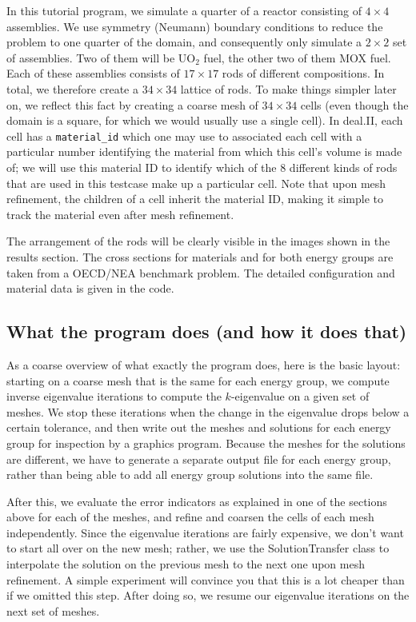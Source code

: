 \documentclass{article}
\begin{document}
In this tutorial program, we simulate a quarter of a reactor consisting of $4
\times 4$ assemblies. We use symmetry (Neumann) boundary conditions to reduce
the problem to one quarter of the domain, and consequently only simulate a
$2\times 2$ set of assemblies. Two of them will be UO${}_2$ fuel, the other
two of them MOX fuel. Each of these assemblies consists of $17\times 17$ rods
of different compositions. In total, we therefore create a $34\times 34$
lattice of rods. To make things simpler later on, we reflect this fact by
creating a coarse mesh of $34\times 34$ cells (even though the domain is a
square, for which we would usually use a single cell). In deal.II, each cell
has a \texttt{material\_id} which one may use to associated each cell with a
particular number identifying the material from which this cell's volume is
made of; we will use this material ID to identify which of the 8 different
kinds of rods that are used in this testcase make up a particular cell. Note
that upon mesh refinement, the children of a cell inherit the material ID,
making it simple to track the material even after mesh refinement.

The arrangement of the rods will be clearly visible in the images shown in
the results section. The cross sections for materials and for both energy
groups are taken from a OECD/NEA benchmark problem. The detailed configuration
and material data is given in the code.


\subsection{What the program does (and how it does that)}

As a coarse overview of what exactly the program does, here is the basic
layout: starting on a coarse mesh that is the same for each energy group, we
compute inverse eigenvalue iterations to compute the $k$-eigenvalue on a given
set of meshes. We stop these iterations when the change in the eigenvalue
drops below a certain tolerance, and then write out the meshes and solutions
for each energy group for inspection by a graphics program. Because the meshes
for the solutions are different, we have to generate a separate output file
for each energy group, rather than being able to add all energy group
solutions into the same file.

After this, we evaluate the error indicators as explained in one of the sections
above for each of the meshes, and refine and coarsen the cells of each mesh
independently. Since the eigenvalue iterations are fairly expensive, we don't
want to start all over on the new mesh; rather, we use the SolutionTransfer
class to interpolate the solution on the previous mesh to the next one upon
mesh refinement. A simple experiment will convince you that this is a lot
cheaper than if we omitted this step. After doing so, we resume our eigenvalue
iterations on the next set of meshes.
\end{document}
